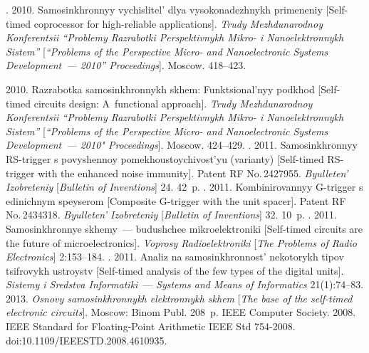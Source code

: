 \begin{multicols}{2}
{{\begin{thebibliography}{99}
. 2010. Samosinkhronnyy vychislitel' dlya vysokonadezhnykh primeneniy 
[Self-timed coprocessor for high-reliable applications]. 
\textit{Trudy Mezhdunarodnoy Konferentsii ``Problemy Razrabotki Perspektivnykh Mikro- i 
Nanoelektronnykh Sistem''} [\textit{``Problems of the Perspective Micro- and Nanoelectronic 
Systems Development~--- 2010'' Proceedings}]. Moscow. 418--423. 

 2010. Razrabotka samosinkhronnykh skhem: Funktsional'nyy podkhod 
[Self-timed circuits design: A~functional approach]. 
\textit{Trudy Mezhdunarodnoy Konferentsii ``Problemy Razrabotki Perspektivnykh Mikro- i 
Nanoelektronnykh Sistem''} [\textit{``Problems of the Perspective Micro- and 
Nanoelectronic Systems Development~--- 2010" Proceedings}]. Moscow. 424--429.
. 2011. 
Samosinkhronnyy RS-trigger s povyshennoy pomekhoustoychivost'yu (varianty) 
[Self-timed RS-trigger with the enhanced noise immunity]. Patent RF No.\,2427955. 
\textit{Byulleten' Izobreteniy} [\textit{Bulletin of Inventions}] 24. 42~p.
. 2011. Kombinirovannyy G-trigger s edinichnym spey\-se\-rom 
[Composite G-trigger with the unit spacer]. Patent RF No.\,2434318. 
\textit{Byulleten' Izobreteniy} [\textit{Bulletin of Inventions}] 32. 10~p.
. 2011. 
Samosinkhronnye skhemy~--- budushchee mikroelektroniki 
[Self-timed circuits are the future of microelectronics]. 
\textit{Voprosy Radioelektroniki} [\textit{The Problems of Radio Electronics}] 2:153--184.
. 
2011. Analiz na samosinkhronnost' nekotorykh tipov tsifrovykh ustroystv 
[Self-timed analysis of the few types of the digital units]. 
\textit{Sistemy i Sredstva Informatiki}~--- \textit{Systems and Means of Informatics}
 21(1):74--83.
 2013. \textit{Osnovy samosinkhronnykh elektronnykh skhem} 
[\textit{The base of the self-timed electronic circuits}]. Moscow: Binom Publ. 208~p.
IEEE Computer Society. 2008. IEEE Standard for Floating-Point Arithmetic IEEE Std 754-2008. 
doi:10.1109/IEEESTD.2008.4610935. 



\end{thebibliography}}}
\end{multicols}
